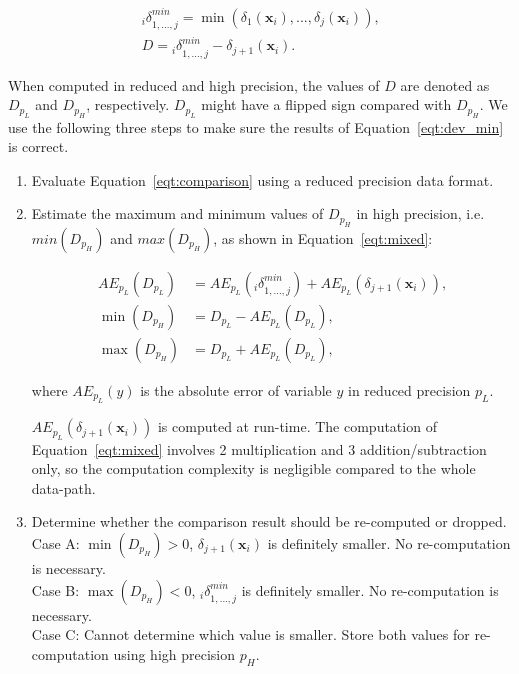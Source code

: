 \begin{equation}
\begin{aligned}
{_i\delta}^{min}_{1,...,j} = \min \left ( {\delta_{1}(\textbf{x}_i),...,\delta_{j}(\textbf{x}_i)} \right ) \mbox{,} \\
D = {_i\delta}^{min}_{1,...,j} - \delta_{j+1}(\textbf{x}_i) \mbox{.}
\end{aligned}
\label{eqt:comparison}
\end{equation}

When computed in reduced and high precision, the values of $D$ are denoted as $D_{p_L}$ and $D_{p_H}$, respectively.
$D_{p_L}$ might have a flipped sign compared with $D_{p_H}$.
We use the following three steps to make sure the results of Equation~\ref{eqt:dev_min} is correct.

\begin{enumerate}
\item Evaluate Equation~\ref{eqt:comparison} using a reduced precision data format. 
\item Estimate the maximum and minimum values of $D_{p_H}$ in high precision, i.e. $min(D_{p_H})$ and $max(D_{p_H})$, as shown in Equation~\ref{eqt:mixed}:

\begin{equation}
\begin{aligned}
AE_{p_L}(D_{p_L}) &= AE_{p_L}({_i\delta}^{min}_{1,...,j}) + AE_{p_L}(\delta_{j+1}(\textbf{x}_i)) \mbox{,} \\
\min{(D_{p_H})} &= D_{p_L} - AE_{p_L}(D_{p_L}) \mbox{,} \\
\max{(D_{p_H})} &= D_{p_L} + AE_{p_L}(D_{p_L}) \mbox{,}
\end{aligned}
\label{eqt:mixed}
\end{equation}

where $AE_{p_L}(y)$ is the absolute error of variable $y$ in reduced precision $p_L$.

$AE_{p_L}(\delta_{j+1}(\textbf{x}_i))$ is computed at run-time.
The computation of Equation~\ref{eqt:mixed} involves 2 multiplication and 3 addition/subtraction only, so the computation complexity is negligible compared to the whole data-path.

\item Determine whether the comparison result should be re-computed or dropped. \\
Case A: $\min{(D_{p_H})}>0$, $\delta_{j+1}(\textbf{x}_i)$ is definitely smaller. No re-computation is necessary. \\
Case B: $\max{(D_{p_H})}<0$, ${_i\delta}^{min}_{1,...,j}$ is definitely smaller. No re-computation is necessary. \\
Case C: Cannot determine which value is smaller. Store both values for re-computation using high precision $p_H$.
\end{enumerate}

